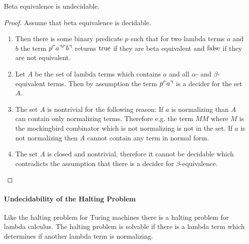\begin{theorem}
  Beta equivalence is undecidable.
  \begin{proof}
    Assume that beta equivalence is decidable.
    \begin{enumerate}
    \item
      Then there is some binary predicate $p$ such that for two lambda
      terms $a$ and $b$ the term $p \ulcorner a \urcorner \ulcorner b \urcorner$ returns $\text{true}$ if
      they are beta equivalent and $\text{false}$ if they are not equivalent.
    \item
      Let $A$ be the set of lambda terms which contains $a$ and all $\alpha$-
      and $\beta$-equivalent terms. Then by assumption the term $p \ulcorner a \urcorner$
      is a decider for the set $A$.
    \item
      The set $A$ is nontrivial for the following reason: If $a$ is
      normalizing than $A$ can contain only normalizing terms. Therefore
      e.g. the term $M M$ where $M$ is the mockingbird combinator which is not
      normalizing is not in the set. If $a$ is not normalizing then $A$ cannot
      contain any term in normal form.
    \item
      The set $A$ is closed and nontrivial, therefore it cannot be decidable
      which contradicts the assumption that there is a decider for
      $\beta$-equivalence.
    \end{enumerate}
  \end{proof}
\end{theorem}



\paragraph{Undecidability of the Halting Problem}

Like the halting problem for Turing machines there is a halting problem for
lambda calculus. The halting problem is solvable if there is a lambda term
which determines if another lambda term is normalizing.

